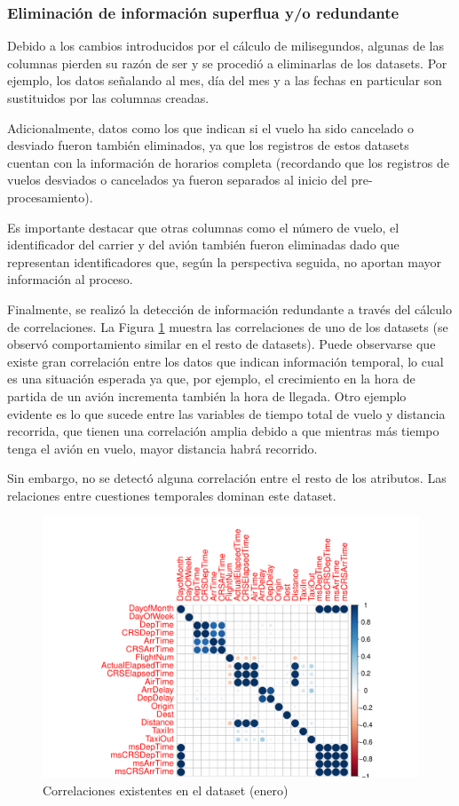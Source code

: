 \documentclass[12pt]{article}
\numberwithin{equation}{section}
\numberwithin{table}{section}
\numberwithin{figure}{section}
\begin{document}
\subsubsection{Eliminación de información superflua y/o redundante}
Debido a los cambios introducidos por el cálculo de milisegundos, algunas de las columnas pierden su razón de ser y se procedió a eliminarlas de los datasets. Por ejemplo, los datos señalando al mes, día del mes y a las fechas en particular son sustituidos por las columnas creadas.


Adicionalmente, datos como los que indican si el vuelo ha sido cancelado o desviado fueron también eliminados, ya que los registros de estos datasets cuentan con la información de horarios completa (recordando que los registros de vuelos desviados o cancelados ya fueron separados al inicio del pre-procesamiento).


Es importante destacar que otras columnas como el número de vuelo, el identificador del carrier y del avión también fueron eliminadas dado que representan identificadores que, según la perspectiva seguida, no aportan mayor información al proceso.


Finalmente, se realizó la detección de información redundante a través del cálculo de correlaciones. 
La Figura \ref{fig:correlaciones} muestra las correlaciones de uno de los datasets (se observó comportamiento similar en el resto de datasets).
Puede observarse que existe gran correlación entre los datos que indican información temporal, lo cual es una situación esperada ya que, por ejemplo, el crecimiento en la hora de partida de un avión incrementa también la hora de llegada.
Otro ejemplo evidente es lo que sucede entre las variables de tiempo total de vuelo y distancia recorrida, que tienen una correlación amplia debido a que mientras más tiempo tenga el avión en vuelo, mayor distancia habrá recorrido.

Sin embargo, no se detectó alguna correlación entre el resto de los atributos. 
Las relaciones entre cuestiones temporales dominan este dataset.

\begin{figure}
\centering
\includegraphics[width=\textwidth]{imagenes/correlaciones-enero}
\caption{Correlaciones existentes en el dataset (enero)}
\label{fig:correlaciones}
\end{figure}
\end{document}
